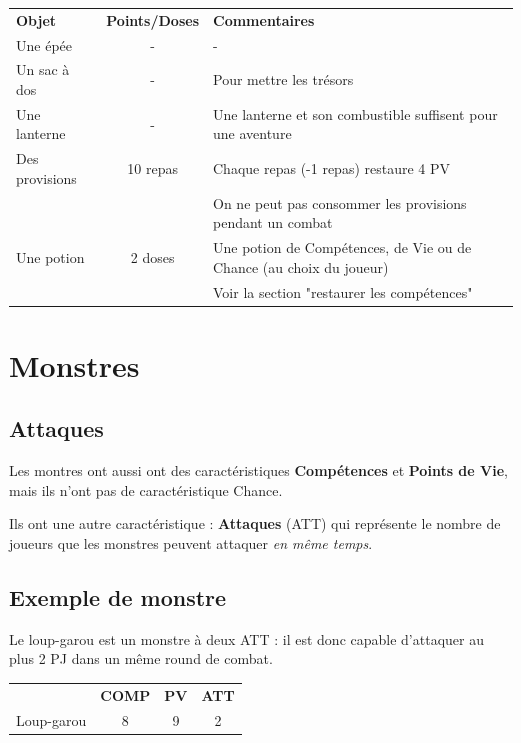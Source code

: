 \documentclass[a4paper, 11pt, twoside]{article}
\begin{document}
\begin{longtable}{lcl}
\textbf{Objet} & \textbf{Points/Doses} & \textbf{Commentaires}\\
Une épée & - & -\\
Un sac à dos & - & Pour mettre les trésors\\
Une lanterne & - & Une lanterne et son combustible suffisent pour une aventure\\
Des provisions & 10 repas & Chaque repas (-1 repas) restaure 4 PV\\
 &  & On ne peut pas consommer les provisions pendant un combat\\
Une potion & 2 doses & Une potion de Compétences, de Vie ou de Chance (au choix du joueur)\\
 &  & Voir la section "restaurer les compétences"\\
\end{longtable}

\section{Monstres}
\label{sec:org676fd90}

\subsection{Attaques}
\label{sec:orge4f364e}

Les montres ont aussi ont des caractéristiques \textbf{Compétences} et \textbf{Points de Vie}, mais ils n'ont pas de caractéristique Chance.

Ils ont une autre caractéristique : \textbf{Attaques} (ATT) qui représente le nombre de joueurs que les monstres peuvent attaquer \emph{en même temps}.

\subsection{Exemple de monstre}
\label{sec:org961bbfe}

Le loup-garou est un monstre à deux ATT : il est donc capable d'attaquer au plus 2 PJ dans un même round de combat.

\newpage

\begin{longtable}{lccc}
 & \textbf{COMP} & \textbf{PV} & \textbf{ATT}\\
Loup-garou & 8 & 9 & 2\\
\end{longtable}
\end{document}
